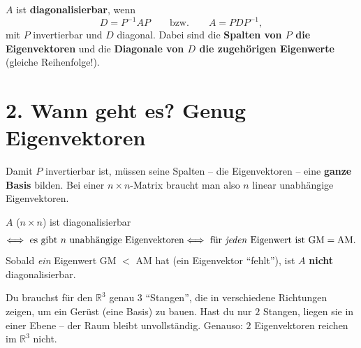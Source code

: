 \documentclass[a4paper,12pt]{article}
\newcommand{\EV}{Eigenvektor}
\begin{document}
\begin{merkbox}[title={Die Formel}]
$A$ ist \textbf{diagonalisierbar}, wenn
\[
D = P^{-1} A P \qquad\text{bzw.}\qquad A = P D P^{-1},
\]
mit $P$ invertierbar und $D$ diagonal. Dabei sind die \textbf{Spalten von $P$ die Eigenvektoren} und die \textbf{Diagonale von $D$ die zugeh\"origen Eigenwerte} (gleiche Reihenfolge!).
\end{merkbox}

\section*{2. Wann geht es? Genug Eigenvektoren}

Damit $P$ invertierbar ist, m\"ussen seine Spalten -- die Eigenvektoren -- eine \textbf{ganze Basis} bilden. Bei einer $n\times n$-Matrix braucht man also $n$ linear unabh\"angige Eigenvektoren.

\begin{merkbox}[title={Diagonalisierbarkeits-Kriterium}]
$A$ ($n\times n$) ist diagonalisierbar
\[
\Longleftrightarrow \ \text{es gibt } n \text{ unabh\"angige Eigenvektoren}
\Longleftrightarrow \ \text{f\"ur \emph{jeden} Eigenwert ist } \text{GM} = \text{AM}.
\]
Sobald \emph{ein} Eigenwert GM $<$ AM hat (ein \EV{} ``fehlt''), ist $A$ \textbf{nicht} diagonalisierbar.
\end{merkbox}

\begin{analogie}
Du brauchst f\"ur den $\mathbb{R}^3$ genau $3$ ``Stangen'', die in verschiedene Richtungen zeigen, um ein Ger\"ust (eine Basis) zu bauen. Hast du nur $2$ Stangen, liegen sie in einer Ebene -- der Raum bleibt unvollst\"andig. Genauso: $2$ Eigenvektoren reichen im $\mathbb{R}^3$ nicht.
\end{analogie}

\begin{center}
\end{center}
\end{document}

